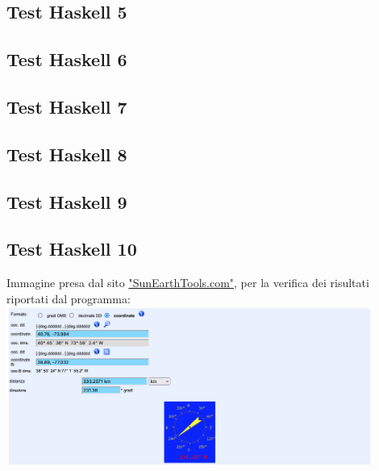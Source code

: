 \documentclass{article}
\begin{document}
\lstset{inputencoding=utf8/latin1}


\subsection*{Test Haskell 5}

\lstset{inputencoding=utf8/latin1}


\subsection*{Test Haskell 6}

\lstset{inputencoding=utf8/latin1}


\subsection*{Test Haskell 7}

\lstset{inputencoding=utf8/latin1}


\subsection*{Test Haskell 8}

\lstset{inputencoding=utf8/latin1}


\subsection*{Test Haskell 9}

\lstset{inputencoding=utf8/latin1}


\subsection*{Test Haskell 10}

\lstset{inputencoding=utf8/latin1}

	
	\bigskip
	Immagine presa dal sito \href{https://www.sunearthtools.com/it/tools/distance.php}{"SunEarthTools.com"}, per la verifica dei risultati riportati dal programma:\\
	\includegraphics[width=0.9\textwidth]{Haskell_Tests/10-Calculation_of_Distant_Coordinates_Check}
	
\end{document}
